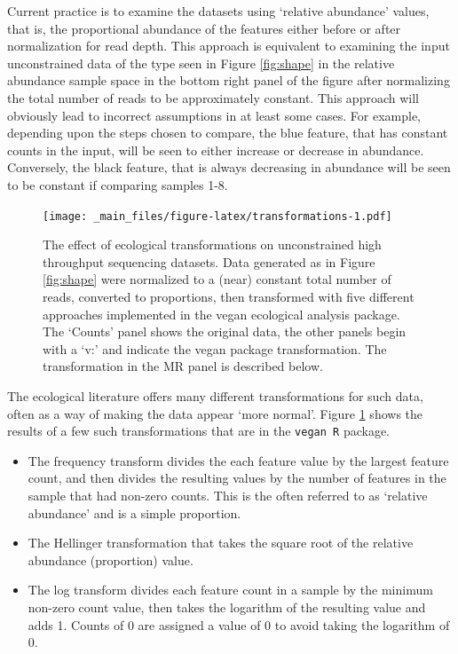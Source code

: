 \documentclass[onecolumn]{book}
\theoremstyle{definition}
\theoremstyle{definition}
\theoremstyle{definition}
\theoremstyle{remark}
\begin{document}
Current practice is to examine the datasets using `relative abundance'
values, that is, the proportional abundance of the features either
before or after normalization for read depth. This approach is
equivalent to examining the input unconstrained data of the type seen in
Figure \ref{fig:shape} in the relative abundance sample space in the
bottom right panel of the figure after normalizing the total number of
reads to be approximately constant. This approach will obviously lead to
incorrect assumptions in at least some cases. For example, depending
upon the steps chosen to compare, the blue feature, that has constant
counts in the input, will be seen to either increase or decrease in
abundance. Conversely, the black feature, that is always decreasing in
abundance will be seen to be constant if comparing samples 1-8.

\begin{figure}
\centering
\texttt{[image: \_main\_files/figure-latex/transformations-1.pdf]}
\caption{\label{fig:transformations}The effect of ecological transformations
on unconstrained high throughput sequencing datasets. Data generated as
in Figure \ref{fig:shape} were normalized to a (near) constant total
number of reads, converted to proportions, then transformed with five
different approaches implemented in the vegan ecological analysis
package. The `Counts' panel shows the original data, the other panels
begin with a `v:' and indicate the vegan package transformation. The
transformation in the MR panel is described below.}
\end{figure}

The ecological literature offers many different transformations for such
data, often as a way of making the data appear `more normal'. Figure
\ref{fig:transformations} shows the results of a few such
transformations that are in the \texttt{vegan\ R} package.

\begin{itemize}
\item
  The frequency transform divides the each feature value by the largest
  feature count, and then divides the resulting values by the number of
  features in the sample that had non-zero counts. This is the often
  referred to as `relative abundance' and is a simple proportion.
\item
  The Hellinger transformation that takes the square root of the
  relative abundance (proportion) value.
\item
  The log transform divides each feature count in a sample by the
  minimum non-zero count value, then takes the logarithm of the
  resulting value and adds 1. Counts of 0 are assigned a value of 0 to
  avoid taking the logarithm of 0.
\end{itemize}
\end{document}
